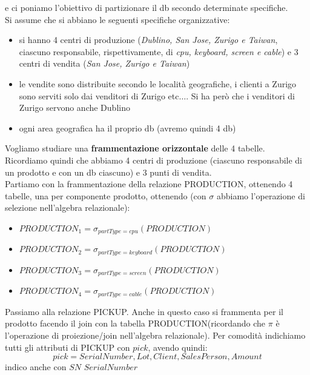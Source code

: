 \documentclass[a4paper,12pt, oneside]{book}
\begin{document}
\begin{esercizio}
  e ci poniamo l'obiettivo di partizionare il db secondo determinate
  specifiche.\\
  Si assume che si abbiano le seguenti specifiche organizzative:
  \begin{itemize}
    \item si hanno 4 centri di produzione (\textit{Dublino, San Jose, Zurigo
      \textnormal{e} Taiwan}, ciascuno responsabile, rispettivamente, di
    \textit{cpu, keyboard, screen \textnormal{e} cable}) e 3 centri di vendita
    (\textit{San Jose, Zurigo  \textnormal{e} Taiwan})
    \item le vendite sono distribuite secondo le località geografiche, i clienti
    a Zurigo sono serviti solo dai venditori di Zurigo etc$\ldots$. Si ha però
    che i venditori di  Zurigo servono anche Dublino
    \item ogni area geografica ha il proprio db (avremo quindi 4 db)
  \end{itemize}
  Vogliamo studiare una \textbf{frammentazione orizzontale} delle 4 tabelle.\\
  Ricordiamo quindi che abbiamo 4 centri di produzione (ciascuno responsabile di
  un prodotto e con un db ciascuno) e 3 punti di vendita.\\
  Partiamo con la frammentazione della relazione \textnormal{PRODUCTION},
  ottenendo 4 tabelle, una per componente prodotto, ottenendo (con $\sigma$
  abbiamo l'operazione di selezione nell'algebra relazionale):
  \begin{itemize}
    \item $PRODUCTION_1=\sigma_{partType=cpu}(PRODUCTION)$
    \item $PRODUCTION_2=\sigma_{partType=keyboard}(PRODUCTION)$
    \item $PRODUCTION_3=\sigma_{partType=screen}(PRODUCTION)$
    \item $PRODUCTION_4=\sigma_{partType=cable}(PRODUCTION)$    
  \end{itemize}
  Passiamo alla relazione \textnormal{PICKUP}. Anche in questo caso si frammenta
  per il prodotto facendo il join con la tabella
  \textnormal{PRODUCTION}(ricordando che $\pi$ è l'operazione di proiezione/join 
  nell'algebra relazionale). Per comodità indichiamo tutti gli attributi di
  \textnormal{PICKUP} con $pick$, avendo quindi:
  \[pick=SerialNumber, Lot, Client, SalesPerson, Amount\]
  indico anche con $SN$ $SerialNumber$
\end{esercizio}
\end{document}
